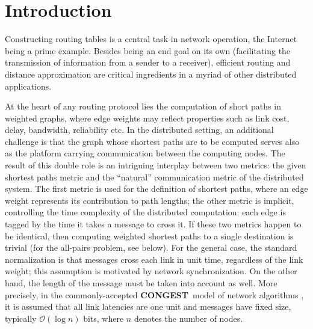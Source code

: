 \documentclass[letterpaper,11pt]{article}
\newcommand{\BO}{\mathcal{O}}
\newcommand{\CONGEST}{\textbf{CONGEST}}
\begin{document}
\section{Introduction}

Constructing routing tables is a central task in network operation, the
Internet being a prime example. Besides being an end goal on its own
(facilitating the transmission of information from a sender to a
receiver), efficient routing and distance approximation are critical
ingredients in a myriad of other distributed applications.

At the heart of any routing protocol lies the computation of short paths in
weighted graphs, where edge weights may reflect properties such as link cost,
delay, bandwidth, reliability etc. In the distributed setting, an additional
challenge is that the graph whose shortest paths are to be computed serves also
as the platform carrying communication between the computing nodes. The result
of this double role is an intriguing interplay between two metrics: the given
shortest paths metric and the ``natural'' communication metric of the
distributed system. The first metric is used for the definition of shortest
paths, where an edge weight represents its contribution to path lengths; the
other metric is implicit, controlling the time complexity of the distributed
computation: each edge is tagged by the time it takes a message to cross it. If
these two metrics happen to be identical, then computing weighted shortest paths
to a single destination is trivial (for the all-pairs problem, see below).
For the general case, the standard normalization is that messages cross each
link in unit time, regardless of the link weight; this assumption is motivated by
network synchronization. On the other hand, the length of the message must be
taken into account as well. More precisely, in the commonly-accepted  \CONGEST\
model of network algorithms \cite{Peleg:book}, it is assumed that all link
latencies are one unit and messages have fixed size, typically $\BO(\log n)$
bits, where $n$ denotes the number of nodes.
\end{document}
